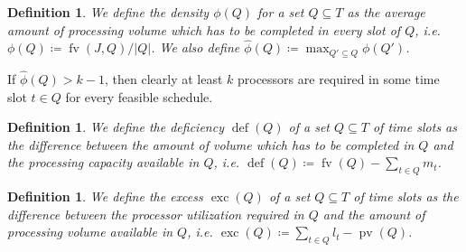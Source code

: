 \documentclass[a4paper]{article}
\DeclareMathOperator{\fv}{fv}
\DeclareMathOperator{\pv}{pv}
\DeclareMathOperator{\opdef}{def}
\DeclareMathOperator{\exc}{exc}
\newtheorem{definition}[theorem]{Definition}
\begin{document}
\begin{definition}
  We define the \emph{density} $\phi(Q)$ for a set $Q \subseteq T$ as the average amount of processing volume which has to be completed in every slot of $Q$, i.e.
  $\phi(Q) \coloneqq \fv(J, Q) / |Q|$.
  We also define $\hat \phi(Q) \coloneqq \max_{Q' \subseteq Q} \phi(Q')$.
\end{definition}
If $\hat \phi(Q) > k - 1$, then clearly at least $k$ processors are required in some time slot $t \in Q$ for every feasible schedule.
\begin{definition}
  We define the \emph{deficiency $\opdef(Q)$ of a set $Q \subseteq T$ of time slots} as the difference between the amount of volume which has to be completed in $Q$ and the processing capacity available in $Q$, i.e. $\opdef(Q) \coloneqq \fv(Q) - \sum_{t \in Q} m_t$.
\end{definition}
\begin{definition}
  We define the \emph{excess $\exc(Q)$ of a set $Q \subseteq T$ of time slots} as the difference between the processor utilization required in $Q$ and the amount of processing volume available in $Q$, i.e. $\exc(Q) \coloneqq \sum_{t \in Q} l_t - \pv(Q)$.
\end{definition}
\end{document}
